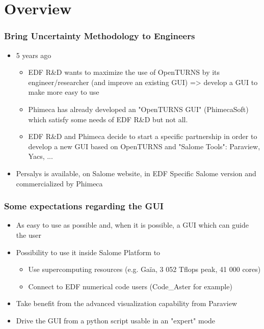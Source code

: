 \documentclass{beamer}
\begin{document}

\section{Overview}

\begin{frame}
\frametitle{Bring Uncertainty Methodology to Engineers}
\begin{itemize}
\item 5 years ago

\begin{itemize}
\item EDF R\&D wants to maximize the use of OpenTURNS\textregistered{} by its engineer/researcher (and improve an existing GUI) => develop a GUI to make more easy to use

\item Phimeca has already developed an "OpenTURNS GUI" (PhimecaSoft\textregistered{}) which satisfy some needs of EDF R\&D but not all.

\item EDF R\&D and Phimeca decide to start a specific partnership in order to develop a new GUI based on OpenTURNS\textregistered{} and "Salome Tools": Paraview, Yacs, ...
\end{itemize}

\item Persalys is available, on Salome website, in EDF Specific Salome version and commercialized by Phimeca
\end{itemize}
\end{frame}

\begin{frame}
\frametitle{Some expectations regarding the GUI}
\begin{itemize}
\item As easy to use as possible and, when it is possible, a GUI which can guide the user 

\item Possibility to use it inside Salome Platform to 
\begin{itemize}
\item Use supercomputing resources (e.g. Gaïa, 3 052 Tflops peak, 41 000 cores)
\item Connect to EDF numerical code users (Code\_Aster for example)
\end{itemize}

\item Take benefit from the advanced visualization capability from Paraview

\item Drive the GUI from a python script usable in an "expert" mode
\end{itemize}
\end{frame}
\end{document}
